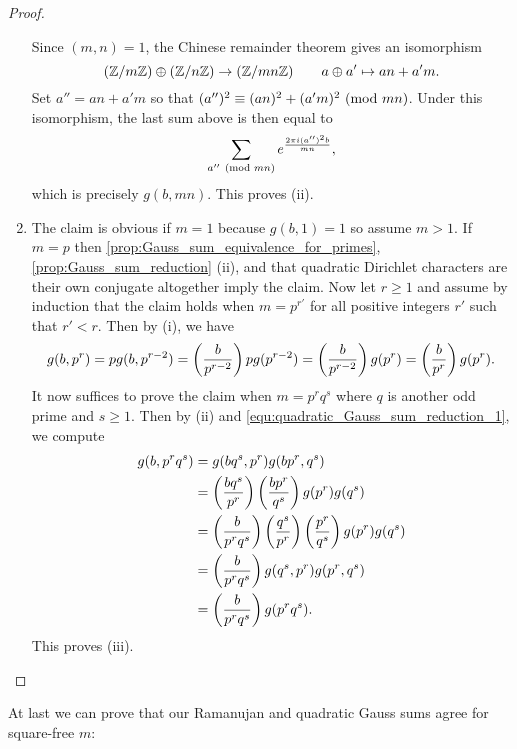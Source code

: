 \begin{proof}
\begin{enumerate}[label*=(\roman*)]
\[            \]
            Since $(m,n) = 1$, the Chinese remainder theorem gives an isomorphism
            \[
              (\mathbb{Z}/m\mathbb{Z}) \oplus (\mathbb{Z}/n\mathbb{Z}) \to (\mathbb{Z}/mn\mathbb{Z}) \qquad a \oplus a' \mapsto an+a'm.
            \]
            Set $a'' = an+a'm$ so that $(a'')^{2} \equiv (an)^{2}+(a'm)^{2} \ (\mathrm{mod}\text{ }mn)$. Under this isomorphism, the last sum above is then equal to
            \[
              \sum_{a'' \ (\mathrm{mod}\text{ }mn)}e^{\frac{2\pi i(a'')^{2}b}{mn}},
            \]
            which is precisely $g(b,mn)$. This proves (ii).
          \item The claim is obvious if $m = 1$ because $g(b,1) = 1$ so assume $m > 1$. If $m = p$ then \cref{prop:Gauss_sum_equivalence_for_primes}, \cref{prop:Gauss_sum_reduction} (ii), and that quadratic Dirichlet characters are their own conjugate altogether imply the claim. Now let $r \ge 1$ and assume by induction that the claim holds when $m = p^{r'}$ for all positive integers $r'$ such that $r' < r$. Then by (i), we have
          \begin{equation}\label{equ:quadratic_Gauss_sum_reduction_1}
            g(b,p^{r}) = pg(b,p^{r-2}) = \left(\frac{b}{p^{r-2}}\right)pg(p^{r-2}) = \left(\frac{b}{p^{r-2}}\right)g(p^{r}) = \left(\frac{b}{p^{r}}\right)g(p^{r}).
          \end{equation}
          It now suffices to prove the claim when $m = p^{r}q^{s}$ where $q$ is another odd prime and $s \ge 1$. Then by (ii) and \cref{equ:quadratic_Gauss_sum_reduction_1}, we compute
          \begin{align*}
            g(b,p^{r}q^{s}) &= g(bq^{s},p^{r})g(bp^{r},q^{s}) \\
            &= \left(\frac{bq^{s}}{p^{r}}\right)\left(\frac{bp^{r}}{q^{s}}\right)g(p^{r})g(q^{s}) \\
            &= \left(\frac{b}{p^{r}q^{s}}\right)\left(\frac{q^{s}}{p^{r}}\right)\left(\frac{p^{r}}{q^{s}}\right)g(p^{r})g(q^{s}) \\
            &= \left(\frac{b}{p^{r}q^{s}}\right)g(q^{s},p^{r})g(p^{r},q^{s}) \\
            &= \left(\frac{b}{p^{r}q^{s}}\right)g(p^{r}q^{s}).
          \end{align*}
          This proves (iii).
        \end{enumerate}
      \end{proof}

      At last we can prove that our Ramanujan and quadratic Gauss sums agree for square-free $m$:

